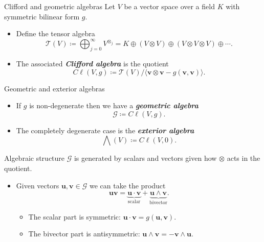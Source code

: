 \documentclass[aspectratio=169,handout]{beamer}
\newcommand\boldgreen[1]{\textcolor{lighter_csu_green}{\emph{\textbf{#1}}}}
\newcommand{\G}{\mathcal{G}}
\newcommand{\blade}[1]{\boldsymbol{#1}}
\begin{document}
\begin{frame}{Clifford and geometric algebras}
\vfill
\pause
Let $V$ be a vector space over a field $K$ with symmetric bilinear form $g$.
\begin{itemize}
        \pause
        \item Define the tensor algebra
        \[
        \mathcal{T}(V) \coloneqq \bigoplus_{j=0}^\infty V^{\otimes_j} = K \oplus (V \otimes V) \oplus (V \otimes V \otimes V) \oplus \cdots.
        \]
        \pause
        \item The associated \boldgreen{Clifford algebra} is the quotient
        \[
        C\ell(V,g) \coloneqq \mathcal{T}(V)/ \langle \blade{v} \otimes \blade{v} - g(\blade{v},\blade{v})\rangle.
        \]
\end{itemize}
\vfill
\end{frame}

\begin{frame}{Geometric and exterior algebras}
\vfill
\begin{itemize}
        \pause
        \item If $g$ is non-degenerate then we have a \boldgreen{geometric algebra}
        \[
        \G \coloneqq C\ell(V,g).
        \]
        \pause
        \item The completely degenerate case is the \boldgreen{exterior algebra}
        \[
        \bigwedge(V) \coloneqq C\ell(V,0).
        \]
\end{itemize}
\vfill
\end{frame}

\begin{frame}{Algebraic structure}
\vfill
\pause
$\G$ is generated by scalars and vectors given how $\otimes$ acts in the quotient.
\begin{itemize}
    \pause
    \item Given vectors $\blade{u}, \blade{v} \in \G$ we can take the product
    \[
    \blade{u}\blade{v} = \underbrace{\blade{u}\cdot \blade{v}}_{\textrm{scalar}} + \underbrace{\blade{u}\wedge \blade{v}}_{\textrm{bivector}}.
    \]
\begin{itemize}
    \pause
    \item The scalar part is symmetric: $\blade{u}\cdot \blade{v} = g(\blade{u},\blade{v})$.
    \pause
    \item The bivector part is antisymmetric: $\blade{u}\wedge \blade{v} = -\blade{v}\wedge \blade{u}$.
\end{itemize}
\end{itemize}
\vfill
\end{frame}
\end{document}
